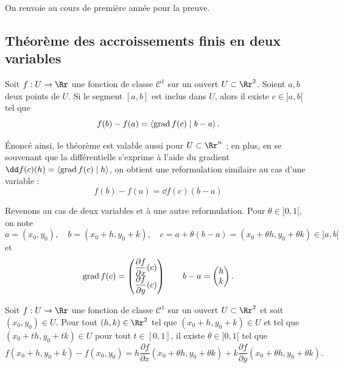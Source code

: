 \documentclass[11pt, class=report,crop=false]{standalone}
\begin{document}
On renvoie au cours de première année pour la preuve.


\subsection{Théorème des accroissements finis en deux variables}


\begin{theoreme}
Soit $f: U \to \Rr$ une fonction de classe $\mathcal{C}^1$ sur un ouvert $U \subset \Rr^2$. Soient $a,b$ deux points de $U$. Si le segment $[a,b]$ est inclus dans $U$, alors il existe 
$c \in ]a,b[$ tel que
$$f(b)-f(a) = \left\langle \operatorname{grad} f (c) \mid b-a \right\rangle.$$
\end{theoreme}


\'Enoncé ainsi, le théorème est valable aussi pour $U \subset \Rr^n$ ; en plus, en se souvenant que la différentielle s'exprime à l'aide du gradient $\dd f(c)(h) = \left\langle \grad f (c) \mid h \right\rangle$, on obtient une reformulation similaire au cas d'une variable : 
$$f(b)-f(a) = \dd f(c)(b-a)$$

Revenons au cas de deux variables et à une autre reformulation. Pour $\theta \in {}]0,1[$, on note
$$a = (x_0,y_0), \quad b=(x_0+h,y_0+k), \quad c = a+\theta (b-a) = (x_0+\theta h,y_0+\theta k) \in ]a,b[$$
et
$$\operatorname{grad} f (c) = 
\begin{pmatrix}
\dfrac{\partial f}{\partial x}(c) \\
\dfrac{\partial f}{\partial y}(c) \end{pmatrix} 
\qquad
b-a = \begin{pmatrix} h \\ k \end{pmatrix} .$$


\begin{theoreme}
Soit $f: U \to \Rr$ une fonction de classe $\mathcal{C}^1$ sur un ouvert $U \subset \Rr^2$ et soit $(x_0,y_0) \in U$. 
Pour tout $(h,k) \in \Rr^2$ tel que $(x_0+h,y_0+k)\in U$
et tel que $(x_0+th,y_0+tk)\in U$ pour tout $t\in[0,1]$, 
il existe $\theta \in ]0,1[$ tel que
$$f(x_0+h,y_0+k) - f(x_0,y_0) = 
h\frac{\partial f}{\partial x}(x_0+\theta h,y_0+\theta k)
+k\frac{\partial f}{\partial y}(x_0+\theta h,y_0+\theta k).$$
\end{theoreme}
\end{document}
